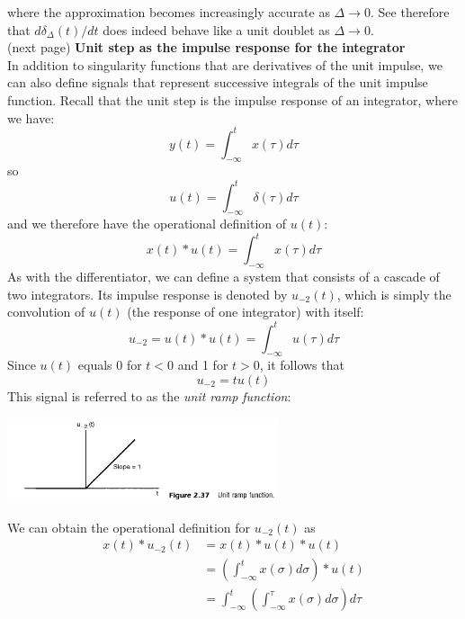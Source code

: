 \documentclass{report}
\begin{document}
where the approximation becomes increasingly accurate as $\Delta\to0$. See therefore that $d\delta_\Delta(t)/dt$ does indeed behave like a unit doublet as $\Delta\to0$.\\
(next page)\newpage
\noindent\textbf{Unit step as the impulse response for the integrator}\\
In addition to singularity functions that are derivatives of the unit impulse, we can also define signals that represent successive integrals of the unit impulse function. Recall that the
unit step is the impulse response of an integrator, where we have:
\begin{equation*}
y(t)=\int^t_{-\infty}x(\tau)d\tau
\end{equation*}
so
\begin{equation*}
u(t)=\int^t_{-\infty}\delta(\tau)d\tau
\end{equation*}
and we therefore have the operational definition of $u(t)$:
\begin{equation*}
x(t)*u(t)=\int^t_{-\infty}x(\tau)d\tau
\end{equation*}
As with the differentiator, we can define a system that consists of a cascade of two integrators. Its impulse response is denoted by $u_{-2}(t)$, which is simply the convolution of $u(t)$ (the response 
of one integrator) with itself:
\begin{equation*}
u_{-2}=u(t)*u(t)=\int^t_{-\infty}u(\tau)d\tau
\end{equation*}
Since $u(t)$ equals 0 for $t<0$ and 1 for $t>0$, it follows that
\begin{equation*}
u_{-2}=tu(t)
\end{equation*}
This signal is referred to as the \textit{unit ramp function}:
\begin{center}
\includegraphics[width=8cm]{a57}\\
\end{center}
We can obtain the operational definition for $u_{-2}(t)$ as
\begin{align*}
x(t)*u_{-2}(t)&=x(t)*u(t)*u(t)\\
&=\left(\int^t_{-\infty}x(\sigma)d\sigma\right)*u(t)\\
&=\int^t_{-\infty}\left(\int^\tau_{-\infty}x(\sigma)d\sigma\right)d\tau
\end{align*}
\end{document}
